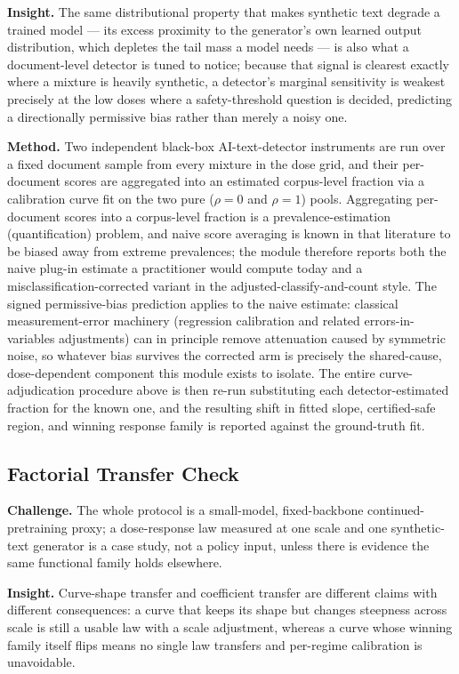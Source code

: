 \documentclass[11pt]{article}
\begin{document}
\textbf{Insight.} The same distributional property that makes synthetic text degrade a trained model --- its excess proximity to the generator's own learned output distribution, which depletes the tail mass a model needs --- is also what a document-level detector is tuned to notice; because that signal is clearest exactly where a mixture is heavily synthetic, a detector's marginal sensitivity is weakest precisely at the low doses where a safety-threshold question is decided, predicting a directionally permissive bias rather than merely a noisy one.

\textbf{Method.} Two independent black-box AI-text-detector instruments are run over a fixed document sample from every mixture in the dose grid, and their per-document scores are aggregated into an estimated corpus-level fraction via a calibration curve fit on the two pure ($\rho = 0$ and $\rho = 1$) pools. Aggregating per-document scores into a corpus-level fraction is a prevalence-estimation (quantification) problem, and naive score averaging is known in that literature to be biased away from extreme prevalences; the module therefore reports both the naive plug-in estimate a practitioner would compute today and a misclassification-corrected variant in the adjusted-classify-and-count style. The signed permissive-bias prediction applies to the naive estimate: classical measurement-error machinery (regression calibration and related errors-in-variables adjustments) can in principle remove attenuation caused by symmetric noise, so whatever bias survives the corrected arm is precisely the shared-cause, dose-dependent component this module exists to isolate. The entire curve-adjudication procedure above is then re-run substituting each detector-estimated fraction for the known one, and the resulting shift in fitted slope, certified-safe region, and winning response family is reported against the ground-truth fit.

\subsection{Factorial Transfer Check}
\textbf{Challenge.} The whole protocol is a small-model, fixed-backbone continued-pretraining proxy; a dose-response law measured at one scale and one synthetic-text generator is a case study, not a policy input, unless there is evidence the same functional family holds elsewhere.

\textbf{Insight.} Curve-shape transfer and coefficient transfer are different claims with different consequences: a curve that keeps its shape but changes steepness across scale is still a usable law with a scale adjustment, whereas a curve whose winning family itself flips means no single law transfers and per-regime calibration is unavoidable.
\end{document}
